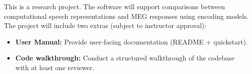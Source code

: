 \documentclass{article}
\begin{document}

This is a research project. The software will support comparisons between computational speech representations and MEG responses using encoding models.
The project will include two extras (subject to instructor approval):

\begin{itemize}
  \item \textbf{User Manual:} Provide user-facing
  documentation (README + quickstart).

  \item \textbf{Code walkthrough:} Conduct a structured walkthrough of the codebase
  with at least one reviewer. 

  
\end{itemize}



\newpage{}



% 

\end{document}
